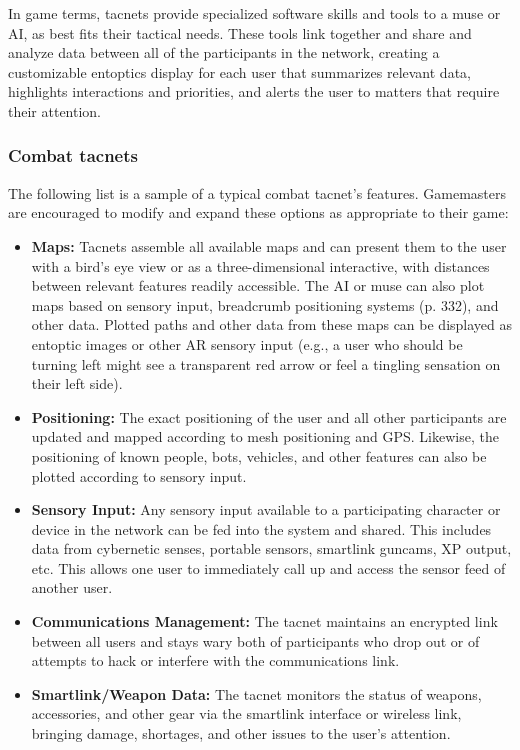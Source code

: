 In game terms, tacnets provide specialized software skills and tools to a muse or AI, as best fits their tactical needs. These tools link together and share and analyze data between all of the participants in the network, creating a customizable entoptics display for each user that summarizes relevant data, highlights interactions and priorities, and alerts the user to matters that require their attention.

\subsubsection{Combat tacnets} The following list is a sample of a typical combat tacnet’s features. Gamemasters are encouraged to modify and expand these options as appropriate to their game:

\begin{itemize}
\item \textbf{Maps:} Tacnets assemble all available maps and can present them to the user with a bird’s eye view or as a three-dimensional interactive, with distances between relevant features readily accessible. The AI or muse can also plot maps based on sensory input, breadcrumb positioning systems (p. 332), and other data. Plotted paths and other data from these maps can be displayed as entoptic images or other AR sensory input (e.g., a user who should be turning left might see a transparent red arrow or feel a tingling sensation on their left side).
\item \textbf{Positioning:} The exact positioning of the user and all other participants are updated and mapped according to mesh positioning and GPS. Likewise, the positioning of known people, bots, vehicles, and other features can also be plotted according to sensory input.
\item \textbf{Sensory Input:} Any sensory input available to a participating character or device in the network can be fed into the system and shared. This includes data from cybernetic senses, portable sensors, smartlink guncams, XP output, etc. This allows one user to immediately call up and access the sensor feed of another user.
\item \textbf{Communications Management:} The tacnet maintains an encrypted link between all users and stays wary both of participants who drop out or of attempts to hack or interfere with the communications link.
\item \textbf{Smartlink/Weapon Data:} The tacnet monitors the status of weapons, accessories, and other gear via the smartlink interface or wireless link, bringing damage, shortages, and other issues to the user’s attention.

\end{itemize}
